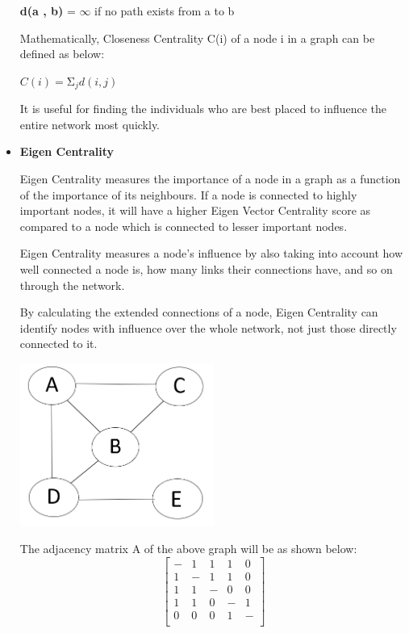 \documentclass[12pt, a4paper]{report}
\begin{document}
\begin{itemize}
    \textbf{d(a , b)} = $\infty$ if no path exists from a to b

    Mathematically, Closeness Centrality C(i) of a node i in a graph can be defined as below:

    $C\left(i\right)=\mathrm{\Sigma}_jd\left(i,j\right) $

    It is useful for finding the individuals who are best placed to influence the entire network most quickly.
    
    \item \textbf{Eigen Centrality}

    Eigen Centrality measures the importance of a node in a graph as a function of the importance of its neighbours. If a node is connected to highly important nodes, it will have a higher Eigen Vector Centrality score as compared to a node which is connected to lesser important nodes.
    
    Eigen Centrality measures a node’s influence by also taking into account how well connected a node is, how many links their connections have, and so on through the network.
    
    By calculating the extended connections of a node, Eigen Centrality can identify nodes with influence over the whole network, not just those directly connected to it.

    \includegraphics[width=0.5\textwidth, center]{graph}
    
    The adjacency matrix A of the above graph will be as shown below:
    \begin{equation*}
    \begin{bmatrix}
    - & 1 & 1 & 1 & 0 \\
    1 & - & 1 & 1 & 0 \\
    1 & 1 & - & 0 & 0 \\
    1 & 1 & 0 & - & 1 \\
    0 & 0 & 0 & 1 & - \\


\end{bmatrix}
\end{equation*}
\end{itemize}
\end{document}
